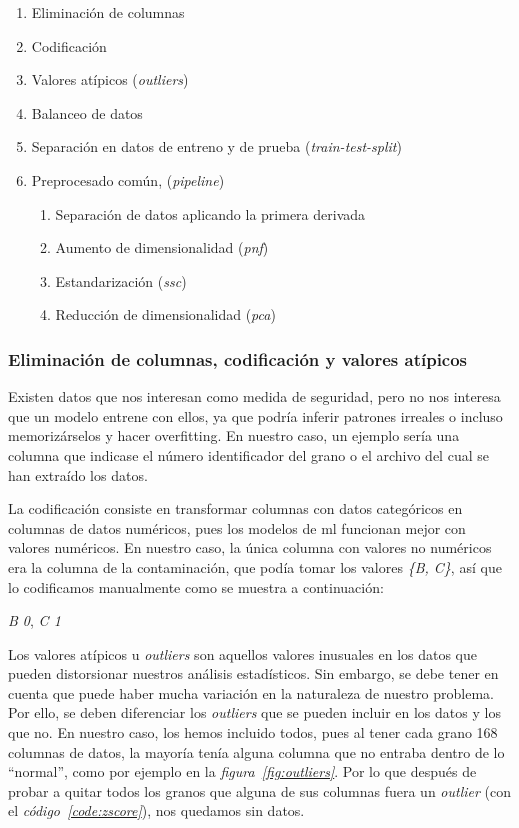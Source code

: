 \begin{enumerate}
    \item Eliminación de columnas
    \item Codificación
    \item Valores atípicos (\textit{outliers})
    \item Balanceo de datos
    \item Separación en datos de entreno y de prueba (\textit{train-test-split})
    \item Preprocesado común, (\textit{pipeline})
    \begin{enumerate}
        \item Separación de datos aplicando la primera derivada 
        \item Aumento de dimensionalidad (\textit{\gls{pnf}})
        \item Estandarización  (\textit{\gls{ssc}})
        \item Reducción de dimensionalidad (\textit{\gls{pca}})
    \end{enumerate}
    
\end{enumerate}


\subsubsection{Eliminación de columnas, codificación y valores atípicos}

Existen datos que nos interesan como medida de seguridad, pero no nos interesa que un modelo entrene con ellos, ya que podría inferir patrones irreales o incluso memorizárselos y hacer \gls{overfitting}. En nuestro caso, un ejemplo sería una columna que indicase el número identificador del grano o el archivo del cual se han extraído los datos.

La codificación consiste en transformar columnas con datos categóricos en columnas de datos numéricos, pues los modelos de \acrshort{ml} funcionan mejor con valores numéricos. En nuestro caso, la única columna con valores no numéricos era la columna de la contaminación, que podía tomar los valores \textit{\{B, C\}}, así que lo codificamos manualmente como se muestra a continuación:

{\centering
    \textit{B \longrightarrow{} 0}, \textit{C \longrightarrow{} 1}\par
}

Los valores atípicos u \textit{outliers} son aquellos valores inusuales en los datos que pueden distorsionar nuestros análisis estadísticos. Sin embargo, se debe tener en cuenta que puede haber mucha variación en la naturaleza de nuestro problema. Por ello, se deben diferenciar los \textit{outliers} que se pueden incluir en los datos y los que no. En nuestro caso, los hemos incluido todos, pues al tener cada grano 168 columnas de datos, la mayoría tenía alguna columna que no entraba dentro de lo ``normal'', como por ejemplo en la \textit{figura\ \ref{fig:outliers}}. Por lo que después de probar a quitar todos los granos que alguna de sus columnas fuera un \textit{outlier} (con el \textit{código\ \ref{code:zscore}}), nos quedamos sin datos.

